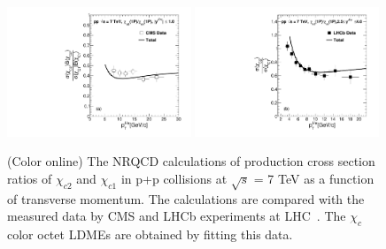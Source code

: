 \documentclass[12pt,a4paper,final]{iopart}
\begin{document}
\begin{figure}
\includegraphics[width=0.49\textwidth]{Fig2a_Chic2Chic1_CMS_Fit.pdf}
\includegraphics[width=0.49\textwidth]{Fig2b_Chic2Chic1_LHCb_Fit.pdf}
\caption{(Color online) The NRQCD calculations of production cross section ratios 
of  $\chi_{c2}$ and $\chi_{c1}$ in p+p collisions at
$\sqrt{s}$ = 7 TeV as a function of transverse momentum. 
The calculations are compared with the measured data by
CMS and LHCb experiments at LHC~\cite{Chatrchyan:2012ub,Aaij:2013dja}. The $\chi_{c}$
color octet LDMEs are obtained by fitting this data. 
}
\label{Fig:LDMEChicCMS_LHCb}
\end{figure}
\end{document}
